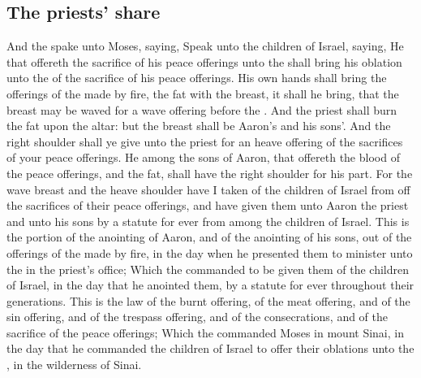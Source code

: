 \begin{biblechapter}
\section*{The priests' share}
\verse And the \LORD spake unto Moses, saying,
\verse Speak unto the children of Israel, saying, He that offereth the sacrifice of his peace offerings unto the \LORD shall bring his oblation unto the \LORD of the sacrifice of his peace offerings.
\verse His own hands shall bring the offerings of the \LORD made by fire, the fat with the breast, it shall he bring, that the breast may be waved for a wave offering before the \LORD.
\verse And the priest shall burn the fat upon the altar: but the breast shall be Aaron's and his sons'.
\verse And the right shoulder shall ye give unto the priest for an heave offering of the sacrifices of your peace offerings.
\verse He among the sons of Aaron, that offereth the blood of the peace offerings, and the fat, shall have the right shoulder for his part.
\verse For the wave breast and the heave shoulder have I taken of the children of Israel from off the sacrifices of their peace offerings, and have given them unto Aaron the priest and unto his sons by a statute for ever from among the children of Israel.
\verse This is the portion of the anointing of Aaron, and of the anointing of his sons, out of the offerings of the \LORD made by fire, in the day when he presented them to minister unto the \LORD in the priest's office;
\verse Which the \LORD commanded to be given them of the children of Israel, in the day that he anointed them, by a statute for ever throughout their generations.
\verse This is the law of the burnt offering, of the meat offering, and of the sin offering, and of the trespass offering, and of the consecrations, and of the sacrifice of the peace offerings;
\verse Which the \LORD commanded Moses in mount Sinai, in the day that he commanded the children of Israel to offer their oblations unto the \LORD, in the wilderness of Sinai.
\end{biblechapter}

